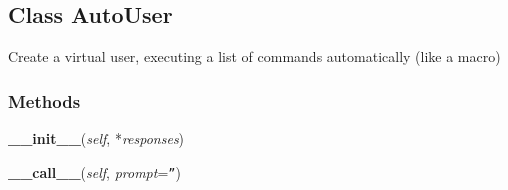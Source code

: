 
\subsection{Class AutoUser}

    \label{autouser:AutoUser}
Create a virtual user, executing a list of commands automatically (like a 
macro)



  \subsubsection{Methods}

    \label{autouser:AutoUser:__init__}

    \vspace{0.5ex}

    \begin{boxedminipage}{\textwidth}

    \raggedright \textbf{\_\_init\_\_}(\textit{self}, *\textit{responses})

    \end{boxedminipage}

    \label{autouser:AutoUser:__call__}

    \vspace{0.5ex}

    \begin{boxedminipage}{\textwidth}

    \raggedright \textbf{\_\_call\_\_}(\textit{self}, \textit{prompt}=\texttt{''})

    \end{boxedminipage}

